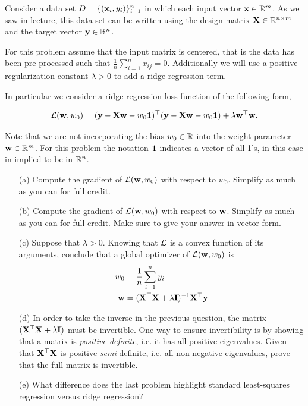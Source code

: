 \documentclass[submit]{harvardml}
\begin{document}
	\begin{problem}
		
		Consider a data set $D = \{(\mathbf{x}_i, y_i)\}_{i=1}^n$ in which each
		input vector $\mathbf{x} \in \mathbb{R}^m$. As we saw in lecture, this
		data set can be written using the design matrix $\mathbf{X} \in
		\mathbb{R}^{n \times m}$ and the target vector $\mathbf{y} \in \mathbb{R}^n$.
		
		
		For this problem assume that the input matrix is centered, that is
		the data has been pre-processed such that $\frac{1}{n} \sum_{i=1}^n
		x_{ij} = 0 $.  Additionally we will use a positive regularization
		constant $\lambda > 0$ to add a ridge regression term.
		
		In particular we consider a ridge regression loss function of the following form,
		
		\[\mathcal{L}(\mathbf{w}, w_0) = (\mathbf{y} - \mathbf{X} \mathbf{w} - w_0 {\bf 1 })^\top (\mathbf{y} - \mathbf{X}
		\mathbf{w} - w_0 {\bf 1 }) + \lambda \mathbf{w}^\top \mathbf{w} .\]
		
		Note that we are not incorporating the bias $w_0\in \mathbb{R}$ into the weight parameter $\mathbf{w} \in \mathbb{R}^m$.
		For this problem the notation ${\bf 1}$ indicates a vector of all 1's, in this case in implied to be in $\mathbb{R}^n$.  
		
		
		\begin{itemize}
			\item[(a)] Compute the gradient of $\mathcal{L}(\mathbf{w}, w_0)$ with respect to $w_0$.
			Simplify as much as you can for full credit.
			\item[(b)] Compute the gradient of $\mathcal{L}(\mathbf{w}, w_0)$ with respect to $\mathbf{w}$.
			Simplify as much as you can for full credit. Make sure to give your answer
			in vector form.
			\item[(c)] Suppose that $\lambda > 0$. Knowing that $\mathcal{L}$ is a convex function
			of its arguments, conclude that a global optimizer of
			$\mathcal{L}(\mathbf{w}, w_0)$ is
			\begin{align}
			w_0 &= \frac{1}{n} \sum_{i=1}^n y_i \\
			\mathbf{w} &= (\mathbf{X}^\top \mathbf{X} + \lambda \mathbf{I})^{-1} \mathbf{X}^\top \mathbf{y}
			\end{align}
			\item[(d)] In order to take the inverse in the previous question, the
			matrix $(\mathbf{X}^\top \mathbf{X} + \lambda \mathbf{I})$ must be invertible.
			One way to ensure invertibility is by showing that a matrix is
			\textit{positive definite}, i.e. it has all positive
			eigenvalues. Given that $\mathbf{X}^\top\mathbf{X}$ is positive
			\textit{semi}-definite, i.e.  all non-negative eigenvalues, prove that the
			full matrix is invertible.
			
			\item[(e)] What difference does the last problem highlight standard least-squares regression versus
			ridge regression?
			
		\end{itemize}
	\end{problem}
	
\end{document}
